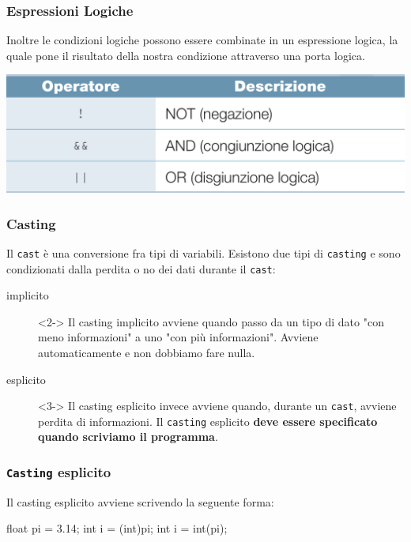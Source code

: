 \documentclass{beamer}
\begin{document}
    \begin{frame}
        \frametitle{Espressioni Logiche}
        Inoltre le condizioni logiche possono essere combinate in un espressione logica, la quale pone il risultato della nostra condizione attraverso una porta logica.
        \begin{center}
             \includegraphics[scale=0.2]{img/logic_expressions.png}
        \end{center}
    \end{frame}

    \begin{frame}
        \frametitle{Casting}
        Il \texttt{cast} è una conversione fra tipi di variabili. Esistono due tipi di \texttt{casting} e sono condizionati dalla perdita o no dei dati durante il \texttt{cast}:
        \begin{description}
            \item[ implicito]<2-> Il casting implicito avviene quando passo da un tipo di dato "con meno informazioni" a uno "con più informazioni". Avviene automaticamente e non dobbiamo fare nulla.
            \item[ esplicito]<3-> Il casting esplicito invece avviene quando, durante un \texttt{cast}, avviene perdita di informazioni. Il \texttt{casting} esplicito \textbf{deve essere specificato quando scriviamo il programma}.
        \end{description}
    \end{frame}

    \begin{frame}[fragile]
        \frametitle{\texttt{Casting} esplicito}
        Il casting esplicito avviene scrivendo la seguente forma:
        \begin{center}
            \begin{cppcode}
                float pi = 3.14;
                int i = (int)pi;
                int i = int(pi);
            \end{cppcode}
        \end{center}
    \end{frame}
\end{document}
